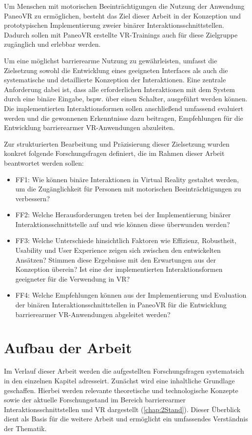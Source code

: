 Um Menschen mit motorischen Beeinträchtigungen die Nutzung der Anwendung PaneoVR zu ermöglichen, besteht das Ziel dieser Arbeit in der Konzeption und prototypischen Implementierung zweier binärer Interaktionsschnittstellen. Dadurch sollen mit PaneoVR erstellte VR-Trainings auch für diese Zielgruppe zugänglich und erlebbar werden.

Um eine möglichst barrierearme Nutzung zu gewährleisten, umfasst die Zielsetzung sowohl die Entwicklung eines geeigneten Interfaces als auch die systematische und detaillierte Konzeption der Interaktionen. Eine zentrale Anforderung dabei ist, dass alle erforderlichen Interaktionen mit dem System durch eine binäre Eingabe, bspw. über einen Schalter, ausgeführt werden können. Die implementierten Interaktionsformen sollen anschließend umfassend evaluiert werden und die gewonnenen Erkenntnisse dazu beitragen, Empfehlungen für die Entwicklung barrierearmer VR-Anwendungen abzuleiten.

Zur strukturierten Bearbeitung und Präzisierung dieser Zielsetzung wurden konkret folgende Forschungsfragen definiert, die im Rahmen dieser Arbeit beantwortet werden sollen:

\begin{itemize}
    \item FF1: Wie können binäre Interaktionen in Virtual Reality gestaltet werden, um die Zugänglichkeit für Personen mit motorischen Beeinträchtigungen zu verbessern?
    \item FF2: Welche Herausforderungen treten bei der Implementierung binärer Interaktionsschnittstelle auf und wie können diese überwunden werden?  
    \item FF3: Welche Unterschiede hinsichtlich Faktoren wie Effizienz, Robustheit, Usability und User Experience zeigen sich zwischen den entwickelten Ansätzen? Stimmen diese Ergebnisse mit den Erwartungen aus der Konzeption überein? Ist eine der implementierten Interaktionsformen geeigneter für die Verwendung in VR?
    \item FF4: Welche Empfehlungen können aus der Implementierung und Evaluation der binären Interaktionsschnittstellen in PaneoVR für die Entwicklung barrierearmer VR-Anwendungen abgeleitet werden?
\end{itemize}
 

\section{Aufbau der Arbeit}

Im Verlauf dieser Arbeit werden die aufgestellten Forschungsfragen systematsich in den einzelnen Kapitel adresseirt. Zunächst wird eine inhaltliche Grundlage geschaffen. Hierbei werden relevante theoretische und technologische Konzepte sowie der aktuelle Forschungsstand im Bereich barrierearmer Interaktionsschnittstellen und VR dargestellt (\autoref{chap:2Stand}). Dieser Überblick dient als Basis für die weitere Arbeit und ermöglicht ein umfassendes Verständnis der Thematik.

